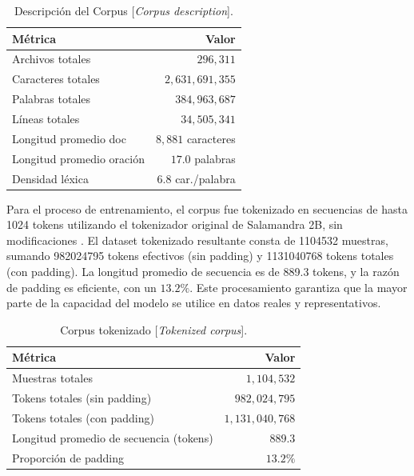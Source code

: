 \documentclass[10pt,twoside]{rcmart} %
\begin{document}
\begin{table}[hbt]
\caption{Descripción del Corpus [\textit{Corpus description}].}
\begin{center}
\begin{tabular}{lr}\hline\hline
Métrica &  Valor \\\hline\hline
Archivos totales           & $296,311$		    \\
Caracteres totales         & $2,631,691,355$    \\
Palabras totales           & $384,963,687$		\\
Líneas totales             & $34,505,341$		\\
Longitud promedio doc      & $8,881$ caracteres \\
Longitud promedio oración  & $17.0$ palabras    \\
Densidad léxica            & $6.8$ car./palabra \\\hline\hline
\end{tabular}
\end{center}
\label{tab:corpus}
\end{table}

Para el proceso de entrenamiento, el corpus fue tokenizado en secuencias de hasta 1024 tokens utilizando el tokenizador original de Salamandra 2B, sin modificaciones \cite{vo2024redwhale}. El dataset tokenizado resultante consta de 1104532 muestras, sumando 982024795 tokens efectivos (sin padding) y 1131040768 tokens totales (con padding). La longitud promedio de secuencia es de 889.3 tokens, y la razón de padding es eficiente, con un $13.2\%$. Este procesamiento garantiza que la mayor parte de la capacidad del modelo se utilice en datos reales y representativos.

\begin{table}[hbt]
\caption{Corpus tokenizado [\textit{Tokenized corpus}].}
\begin{center}
\begin{tabular}{lr}\hline\hline
Métrica 							   & Valor 			 \\\hline\hline
Muestras totales                       & $1,104,532$     \\
Tokens totales (sin padding)           & $982,024,795$   \\
Tokens totales (con padding)           & $1,131,040,768$ \\
Longitud promedio de secuencia (tokens)& $889.3$         \\
Proporción de padding                  & $13.2\%$        \\\hline\hline
\end{tabular}
\end{center}
\label{tab:tok-corpus}
\end{table}
\end{document}
